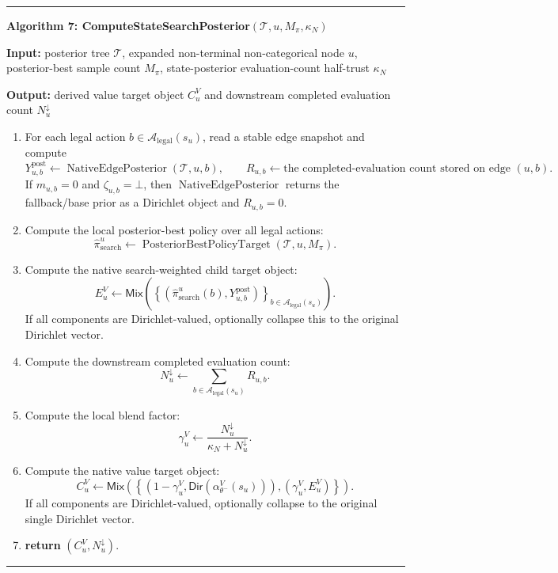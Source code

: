 \documentclass[11pt]{article}
\newcommand{\Tree}{\mathcal{T}}
\newcommand{\Legal}{\mathcal{A}_{\mathrm{legal}}}
\newcommand{\PosteriorBestPolicyTarget}{\operatorname{PosteriorBestPolicyTarget}}
\newcommand{\DirObj}{\mathsf{Dir}}
\newcommand{\MixObj}{\mathsf{Mix}}
\newcommand{\NativeEdgePosterior}{\operatorname{NativeEdgePosterior}}
\newenvironment{algorithmblock}[1]
{
  \par\medskip
  \noindent\hrule\par\smallskip
  \noindent\textbf{#1}
  \par\smallskip
}
{
  \par\smallskip\noindent\hrule\par\medskip
}
\newcommand{\Input}{\textbf{Input: }}
\newcommand{\Output}{\textbf{Output: }}
\newcommand{\Return}{\textbf{return }}
\begin{document}
\begin{algorithmblock}{Algorithm 7: ComputeStateSearchPosterior\((\Tree,u,M_\pi,\kappa_N)\)}

\Input posterior tree \(\Tree\), expanded non-terminal non-categorical node \(u\), posterior-best sample count \(M_\pi\), state-posterior evaluation-count half-trust \(\kappa_N\)

\Output derived value target object \(C^V_u\) and downstream completed evaluation count \(N^\downarrow_u\)

\begin{enumerate}[leftmargin=2em]
  \item For each legal action \(b\in\Legal(s_u)\), read a stable edge snapshot and compute
  \[
  Y^{\mathrm{post}}_{u,b}
  \gets
  \NativeEdgePosterior(\Tree,u,b),
  \qquad
  R_{u,b}
  \gets
  \text{the completed-evaluation count stored on edge }(u,b).
  \]
  If \(m_{u,b}=0\) and \(\zeta_{u,b}=\bot\), then
  \(\NativeEdgePosterior\) returns the fallback/base prior as a Dirichlet object
  and \(R_{u,b}=0\).

  \item Compute the local posterior-best policy over all legal actions:
  \[
  \hat\pi_{\mathrm{search}}^u
  \gets
  \PosteriorBestPolicyTarget(\Tree,u,M_\pi).
  \]

  \item Compute the native search-weighted child target object:
  \[
  E^V_u
  \gets
  \MixObj
  \left(
  \left\{
  (\hat\pi_{\mathrm{search}}^u(b),Y^{\mathrm{post}}_{u,b})
  \right\}_{b\in\Legal(s_u)}
  \right).
  \]
  If all components are Dirichlet-valued, optionally collapse this to the
  original Dirichlet vector.

  \item Compute the downstream completed evaluation count:
  \[
  N^\downarrow_u
  \gets
  \sum_{b\in\Legal(s_u)}R_{u,b}.
  \]

  \item Compute the local blend factor:
  \[
  \gamma^V_u
  \gets
  \frac{N^\downarrow_u}{\kappa_N+N^\downarrow_u}.
  \]

  \item Compute the native value target object:
  \[
  C^V_u
  \gets
  \MixObj
  \left(
  \left\{
  (1-\gamma^V_u,\DirObj(\alpha_{\theta^-}^V(s_u))),
  (\gamma^V_u,E^V_u)
  \right\}
  \right).
  \]
  If all components are Dirichlet-valued, optionally collapse to the original
  single Dirichlet vector.

  \item \Return \((C^V_u,N^\downarrow_u)\).
\end{enumerate}

\end{algorithmblock}
\end{document}
